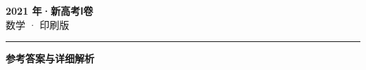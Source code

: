 \documentclass[zihao=5, a4paper]{ctexart}
\begin{document}
\begin{center}
  {\Large\bfseries 2021 年·新高考Ⅰ卷}\\[4pt]
  {\large 数学 · 印刷版}
\end{center}
\medskip
{}

\par\bigskip\hrule\bigskip
{}
\begin{center}{\large\bfseries 参考答案与详细解析}\end{center}
\smallskip

\end{document}
